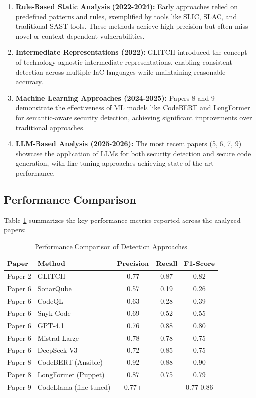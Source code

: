 \documentclass[11pt,a4paper]{article}
\begin{document}
\begin{enumerate}
    \item \textbf{Rule-Based Static Analysis (2022-2024):} Early approaches relied on predefined patterns and rules, exemplified by tools like SLIC, SLAC, and traditional SAST tools. These methods achieve high precision but often miss novel or context-dependent vulnerabilities.
    
    \item \textbf{Intermediate Representations (2022):} GLITCH introduced the concept of technology-agnostic intermediate representations, enabling consistent detection across multiple IaC languages while maintaining reasonable accuracy.
    
    \item \textbf{Machine Learning Approaches (2024-2025):} Papers 8 and 9 demonstrate the effectiveness of ML models like CodeBERT and LongFormer for semantic-aware security detection, achieving significant improvements over traditional approaches.
    
    \item \textbf{LLM-Based Analysis (2025-2026):} The most recent papers (5, 6, 7, 9) showcase the application of LLMs for both security detection and secure code generation, with fine-tuning approaches achieving state-of-the-art performance.
\end{enumerate}

\subsection{Performance Comparison}

Table \ref{tab:performance} summarizes the key performance metrics reported across the analyzed papers:

\begin{table}[H]
\centering
\caption{Performance Comparison of Detection Approaches}
\label{tab:performance}
\begin{tabular}{llccc}
\toprule
\textbf{Paper} & \textbf{Method} & \textbf{Precision} & \textbf{Recall} & \textbf{F1-Score} \\
\midrule
Paper 2 & GLITCH & 0.77 & 0.87 & 0.82 \\
Paper 6 & SonarQube & 0.57 & 0.19 & 0.26 \\
Paper 6 & CodeQL & 0.63 & 0.28 & 0.39 \\
Paper 6 & Snyk Code & 0.69 & 0.52 & 0.55 \\
Paper 6 & GPT-4.1 & 0.76 & 0.88 & 0.80 \\
Paper 6 & Mistral Large & 0.78 & 0.78 & 0.75 \\
Paper 6 & DeepSeek V3 & 0.72 & 0.85 & 0.75 \\
Paper 8 & CodeBERT (Ansible) & 0.92 & 0.88 & 0.90 \\
Paper 8 & LongFormer (Puppet) & 0.87 & 0.75 & 0.79 \\
Paper 9 & CodeLlama (fine-tuned) & 0.77+ & -- & 0.77-0.86 \\
\bottomrule
\end{tabular}
\end{table}
\end{document}
